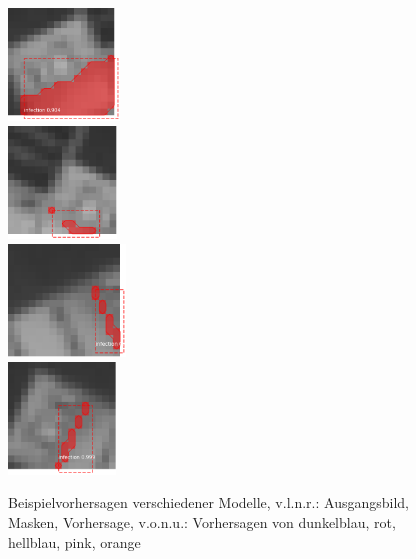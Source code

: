 \begin{figure}[H]
\begin{minipage}[c]{.3\textwidth}
  \\ \vspace{.25cm}
  \includegraphics[height=3cm]{pics/pred-3-3.png}
  \\ \vspace{.25cm}
  \includegraphics[height=3cm]{pics/pred-3-4.png}
  \\ \vspace{.25cm}
  \includegraphics[height=3cm]{pics/pred-3-5.png}
  \\ \vspace{.25cm}
  \includegraphics[height=3cm]{pics/pred-3-1.png}
  \end{minipage}

  \caption[Beispielvorhersagen Experiment 3]{Beispielvorhersagen verschiedener Modelle, v.l.n.r.: Ausgangsbild, Masken, Vorhersage, v.o.n.u.: Vorhersagen von dunkelblau, rot, hellblau, pink, orange}
  \label{fig:pred-3}
\end{figure}
\noindent
